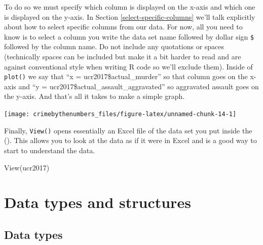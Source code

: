 \documentclass[
]{krantz}
\makeatletter
\newenvironment{Shaded}{\begin{snugshade}}{\end{snugshade}}
\newcommand{\AttributeTok}[1]{\textcolor[rgb]{0.61,0.61,0.61}{#1}}
\newcommand{\FunctionTok}[1]{\textcolor[rgb]{0,0,0}{#1}}
\newcommand{\NormalTok}[1]{#1}
\newcommand{\SpecialCharTok}[1]{\textcolor[rgb]{0,0,0}{#1}}
\newenvironment{kframe}{%
\medskip{}
\setlength{\fboxsep}{.8em}
 \def\at@end@of@kframe{}%
 \ifinner\ifhmode%
  \def\at@end@of@kframe{\end{minipage}}%
  \begin{minipage}{\columnwidth}%
 \fi\fi%
 \def\FrameCommand##1{\hskip\@totalleftmargin \hskip-\fboxsep
 \colorbox{shadecolor}{##1}\hskip-\fboxsep
     \hskip-\linewidth \hskip-\@totalleftmargin \hskip\columnwidth}%
 \MakeFramed {\advance\hsize-\width
   \@totalleftmargin\z@ \linewidth\hsize
   \@setminipage}}%
 {\par\unskip\endMakeFramed%
 \at@end@of@kframe}
\renewenvironment{Shaded}{\begin{kframe}}{\end{kframe}}
\makeatother
\begin{document}
To do so we must specify which column is displayed on the x-axis and which one is displayed on the y-axis. In Section \ref{select-specific-columns} we'll talk explicitly about how to select specific columns from our data. For now, all you need to know is to select a column you write the data set name followed by dollar sign \texttt{\$} followed by the column name. Do not include any quotations or spaces (technically spaces can be included but make it a bit harder to read and are against conventional style when writing R code so we'll exclude them). Inside of \texttt{plot()} we say that ``x = ucr2017\$actual\_murder'' so that column goes on the x-axis and ``y = ucr2017\$actual\_assault\_aggravated'' so aggravated assault goes on the y-axis. And that's all it takes to make a simple graph.

\begin{Shaded}
\end{Shaded}

\begin{center}\texttt{[image: crimebythenumbers\_files/figure-latex/unnamed-chunk-14-1]} \end{center}

Finally, \texttt{View()} opens essentially an Excel file of the data set you put inside the (). This allows you to look at the data as if it were in Excel and is a good way to start to understand the data.

\begin{Shaded}
\begin{Highlighting}[]
\FunctionTok{View}\NormalTok{(ucr2017)}
\end{Highlighting}
\end{Shaded}

\hypertarget{data_types}{%
\chapter{Data types and structures}\label{data_types}}

\hypertarget{data-types}{%
\section{Data types}\label{data-types}}
\end{document}
